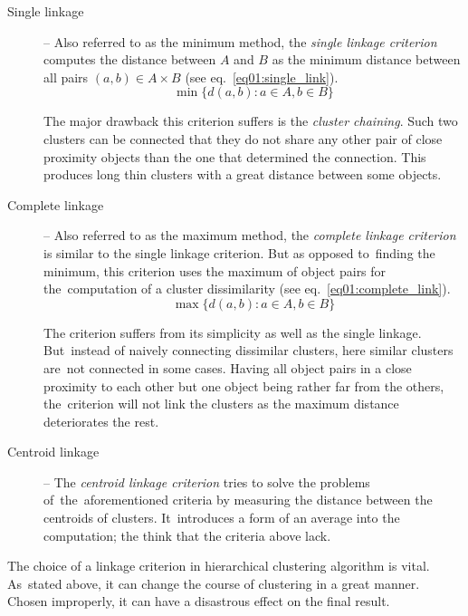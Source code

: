 \begin{description}
	\item[Single linkage] -- Also referred to as the minimum method, the \emph{single linkage criterion} computes the distance between $A$ and $B$ as the minimum distance between all pairs $(a,b) \in A\times B$ (see eq.~\ref{eq01:single_link}).
	\begin{equation}\label{eq01:single_link}
	\min\{d(a,b) : a \in A, b \in B\}
	\end{equation}
	
	The major drawback this criterion suffers is the \emph{cluster chaining}. Such two clusters can be connected that they do not share any other pair of close proximity objects than the one that determined the connection. This produces long thin clusters with a great distance between some objects.
	
	\item[Complete linkage] -- Also referred to as the maximum method, the \emph{complete linkage criterion} is similar to the single linkage criterion. But as opposed to~finding the minimum, this criterion uses the maximum of object pairs for the~computation of a cluster dissimilarity (see eq.~\ref{eq01:complete_link}). 
	\begin{equation}\label{eq01:complete_link}
	\max\{d(a,b) : a \in A, b \in B\}
	\end{equation}
	
	The criterion suffers from its simplicity as well as the single linkage. But~instead of naively connecting dissimilar clusters, here similar clusters are~not connected in some cases. Having all object pairs in a close proximity to each other but one object being rather far from the others, the~criterion will not link the clusters as the maximum distance deteriorates the rest.
	
	\item[Centroid linkage] -- The \emph{centroid linkage criterion} tries to solve the problems of~the~aforementioned criteria by measuring the distance between the centroids of clusters. It~introduces a form of an average into the computation; the think that the criteria above lack.
\end{description}

The choice of a linkage criterion in hierarchical clustering algorithm is vital. As~stated above, it can change the course of clustering in a great manner. Chosen improperly, it can have a disastrous effect on the final result.

